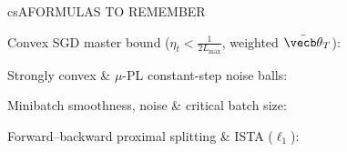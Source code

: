 \documentclass[../../../../master.tex]{subfiles}
\begin{document}
\csnextpage

\begin{cscolumns}
\begin{cscard}{csA}{FORMULAS TO REMEMBER}
  \begin{csbul}
    \item Convex SGD master bound ($\eta_t<\frac{1}{2L_{\max}}$, weighted $\bar{\vecb\theta}_T$):
    \item Strongly convex \& $\mu$-PL constant-step noise balls:
    \item Minibatch smoothness, noise \& critical batch size:
    \item Forward--backward proximal splitting \& ISTA ($\ell_1$):
  \end{csbul}
\end{cscard}


\end{cscolumns}
\end{document}
